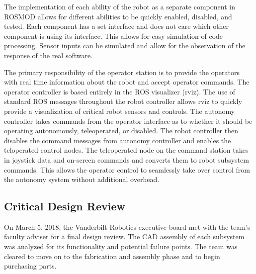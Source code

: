 \documentclass[class=article, crop=false]{standalone}
\begin{document}
	The implementation of each ability of the robot as a separate component in ROSMOD allows for different abilities to be quickly enabled, disabled, and tested. Each component has a set interface and does not care which other component is using its interface. This allows for easy simulation of code processing. Sensor inputs can be simulated and allow for the observation of the response of the real software.

	
	
	The primary responsibility of the operator station is to provide the operators with real time information about the robot and accept operator commands. The operator controller is based entirely in the ROS visualizer (rviz). The use of standard ROS messages throughout the robot controller allows rviz to quickly provide a visualization of critical robot sensors and controls. The autonomy controller takes commands from the operator interface as to whether it should be operating autonomously, teleoperated, or disabled. The robot controller then disables the command messages from autonomy controller and enables the teloperated control nodes. The teleoperated node on the command station takes in joystick data and on-screen commands and converts them to robot subsystem commands. This allows the operator control to seamlessly take over control from the autonomy system without additional overhead.
	
	
	
	\subsection{Critical Design Review}
	
	On March 5, 2018, the Vanderbilt Robotics executive board met with the team’s faculty adviser for a final design review. The CAD assembly of each subsystem was analyzed for its functionality and potential failure points. The team was cleared to move on to the fabrication and assembly phase and to begin purchasing parts. 
	
	
	


	
\end{document}
